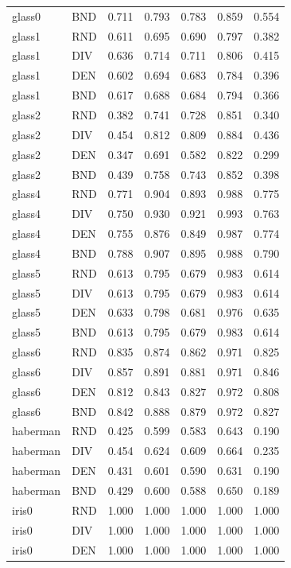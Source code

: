 \documentclass[10pt,a4paper]{article}
\begin{document}
\begin{longtable}{lllllrr}
glass0 & BND & 0.711 & 0.793 & 0.783 & 0.859 & 0.554 \\
glass1 & RND & 0.611 & 0.695 & 0.690 & 0.797 & 0.382 \\
glass1 & DIV & 0.636 & 0.714 & 0.711 & 0.806 & 0.415 \\
glass1 & DEN & 0.602 & 0.694 & 0.683 & 0.784 & 0.396 \\
glass1 & BND & 0.617 & 0.688 & 0.684 & 0.794 & 0.366 \\
glass2 & RND & 0.382 & 0.741 & 0.728 & 0.851 & 0.340 \\
glass2 & DIV & 0.454 & 0.812 & 0.809 & 0.884 & 0.436 \\
glass2 & DEN & 0.347 & 0.691 & 0.582 & 0.822 & 0.299 \\
glass2 & BND & 0.439 & 0.758 & 0.743 & 0.852 & 0.398 \\
glass4 & RND & 0.771 & 0.904 & 0.893 & 0.988 & 0.775 \\
glass4 & DIV & 0.750 & 0.930 & 0.921 & 0.993 & 0.763 \\
glass4 & DEN & 0.755 & 0.876 & 0.849 & 0.987 & 0.774 \\
glass4 & BND & 0.788 & 0.907 & 0.895 & 0.988 & 0.790 \\
glass5 & RND & 0.613 & 0.795 & 0.679 & 0.983 & 0.614 \\
glass5 & DIV & 0.613 & 0.795 & 0.679 & 0.983 & 0.614 \\
glass5 & DEN & 0.633 & 0.798 & 0.681 & 0.976 & 0.635 \\
glass5 & BND & 0.613 & 0.795 & 0.679 & 0.983 & 0.614 \\
glass6 & RND & 0.835 & 0.874 & 0.862 & 0.971 & 0.825 \\
glass6 & DIV & 0.857 & 0.891 & 0.881 & 0.971 & 0.846 \\
glass6 & DEN & 0.812 & 0.843 & 0.827 & 0.972 & 0.808 \\
glass6 & BND & 0.842 & 0.888 & 0.879 & 0.972 & 0.827 \\
haberman & RND & 0.425 & 0.599 & 0.583 & 0.643 & 0.190 \\
haberman & DIV & 0.454 & 0.624 & 0.609 & 0.664 & 0.235 \\
haberman & DEN & 0.431 & 0.601 & 0.590 & 0.631 & 0.190 \\
haberman & BND & 0.429 & 0.600 & 0.588 & 0.650 & 0.189 \\
iris0 & RND & 1.000 & 1.000 & 1.000 & 1.000 & 1.000 \\
iris0 & DIV & 1.000 & 1.000 & 1.000 & 1.000 & 1.000 \\
iris0 & DEN & 1.000 & 1.000 & 1.000 & 1.000 & 1.000 \\

\end{longtable}
\end{document}

